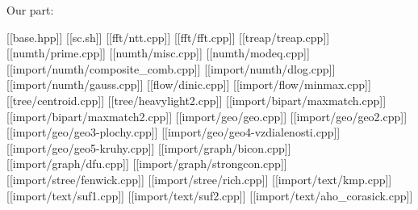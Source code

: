 Our part:

[[base.hpp]]
[[sc.sh]]
[[fft/ntt.cpp]]
[[fft/fft.cpp]]
[[treap/treap.cpp]]
[[numth/prime.cpp]]
[[numth/misc.cpp]]
[[numth/modeq.cpp]]
[[import/numth/composite_comb.cpp]]
[[import/numth/dlog.cpp]]
[[import/numth/gauss.cpp]]
[[flow/dinic.cpp]]
[[import/flow/minmax.cpp]]
[[tree/centroid.cpp]]
[[tree/heavylight2.cpp]]
[[import/bipart/maxmatch.cpp]]
[[import/bipart/maxmatch2.cpp]]
[[import/geo/geo.cpp]]
[[import/geo/geo2.cpp]]
[[import/geo/geo3-plochy.cpp]]
[[import/geo/geo4-vzdialenosti.cpp]]
[[import/geo/geo5-kruhy.cpp]]
[[import/graph/bicon.cpp]]
[[import/graph/dfu.cpp]]
[[import/graph/strongcon.cpp]]
[[import/stree/fenwick.cpp]]
[[import/stree/rich.cpp]]
[[import/text/kmp.cpp]]
[[import/text/suf1.cpp]]
[[import/text/suf2.cpp]]
[[import/text/aho_corasick.cpp]]

\singlecolumn
\bye
